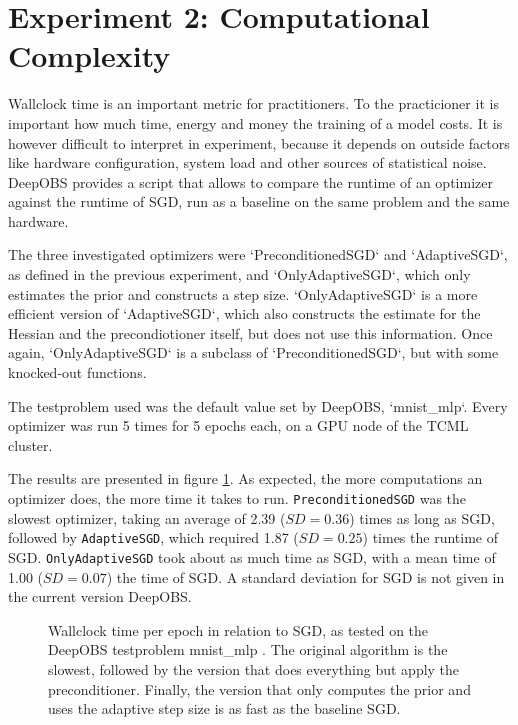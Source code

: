 \documentclass[twoside,12pt,a4paper]{report}
\begin{document}
\section{Experiment 2: Computational Complexity}
\begin{markdown}
Wallclock time is an important metric for practitioners. To the practicioner it is important how much time, energy and money the training of a model costs. It is however difficult to interpret in experiment, because it depends on outside factors like hardware configuration, system load and other sources of statistical noise. DeepOBS provides a script that allows to compare the runtime of an optimizer against the runtime of SGD, run as a baseline on the same problem and the same hardware.

The three investigated optimizers were `PreconditionedSGD` and `AdaptiveSGD`, as defined in the previous experiment, and `OnlyAdaptiveSGD`, which only estimates the prior and constructs a step size. `OnlyAdaptiveSGD` is a more efficient version of `AdaptiveSGD`, which also constructs the estimate for the Hessian and the precondiotioner itself, but does not use this information. Once again, `OnlyAdaptiveSGD` is a subclass of `PreconditionedSGD`, but with some knocked-out functions.

The testproblem used was the default value set by DeepOBS, `mnist_mlp`. Every optimizer was run 5 times for 5 epochs each, on a GPU node of the TCML cluster.
\end{markdown}

The results are presented in figure \ref{fig:exp_perf_prec}. As expected, the more computations an optimizer does, the more time it takes to run.
\verb|PreconditionedSGD| was the slowest optimizer, taking an average of 2.39 ($SD = 0.36$) times as long as SGD, followed by \verb|AdaptiveSGD|, which required 1.87 ($SD = 0.25$) times the runtime of SGD. \verb|OnlyAdaptiveSGD| took about as much time as SGD, with a mean time of 1.00 ($SD = 0.07$) the time of SGD. A standard deviation for SGD is not given in the current version DeepOBS.


\begin{figure}
	\centering \hspace{-1,5cm}
	
	\caption{Wallclock time per epoch in relation to SGD, as tested on the DeepOBS testproblem mnist\_mlp . The original algorithm is the slowest, followed by the version that does everything but apply the preconditioner. Finally, the version that only computes the prior and uses the adaptive step size is as fast as the baseline SGD.}
	\label{fig:exp_perf_prec}
	
\end{figure}
\end{document}

